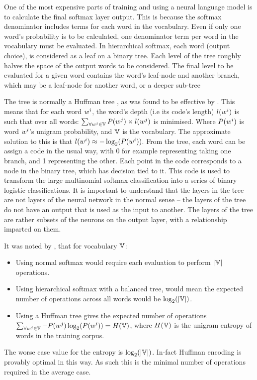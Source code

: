 \documentclass[parskip]{komatufte}
\begin{document}
One of the most expensive parts of training and using a neural language model is  to calculate the final softmax layer output.
This is because the softmax denominator includes terms for each word in the vocabulary.
Even if only one word's probability is to be calculated, one denominator term per word in the vocabulary must be evaluated.
In hierarchical softmax, each word (output choice), is considered as a leaf on a binary tree.
Each level of the tree roughly halves the space of the output words to be considered.
The final level to be evaluated for a given word contains the word's leaf-node and another branch, which may be a leaf-node for another word, or a deeper sub-tree

The tree is normally a Huffman tree , as was found to be effective by \textcite{mikolov2013efficient}.
This means that for each word $\n w_i$, the word's depth (i.e its code's length) $l(\n w_i)$ is such that over all words:
 $\sum_{\forall \n w_j \in \set{V}} P(\n w_j)\times l(\n w_j)$ is minimised.
Where $P(\n w_i)$ is word $\n w_i$'s unigram probability, and $\mathbb{V}$ is the vocabulary.
The approximate solution to this is that $l(\n w_i) \approx -\log_2(P(\n w_i))$.
From the tree, each word can be assign a code in the usual way, with 0 for example representing taking one branch, and 1 representing the other.
Each point in the code corresponds to a node in the binary tree, which has decision tied to it.
This code is used to transform the large  multinomial softmax classification into a series of binary logistic classifications.
It is important to understand that the layers in the tree are not layers of the neural network in the normal sense -- the layers of the tree do not have an output that is used as the input to another.
The layers of the tree are rather subsets of the neurons on the output layer, with a relationship imparted on them.

It was noted by \textcite{mikolov2013efficient}, that for vocabulary $\mathbb{V}$:
\begin{itemize}
	\item Using normal softmax would require each evaluation to perform $|\mathbb{V}|$ operations.
	\item Using hierarchical softmax with a balanced tree, would mean the expected number of operations across all words would be $\log_2(|\mathbb{V}|)$.
	\item Using a Huffman tree gives the expected number of operations $\sum_{\forall \n w_j \in \set{V}} -P(\n w_j)\log_2(P(\n w_i)) = H(\set{V})$, where $H(\mathbb{V})$ is the unigram entropy of words in the training corpus.
\end{itemize}
The worse case value for the entropy is $\log_2(|\mathbb{V}|)$.
In-fact Huffman encoding is provably optimal in this way.
As such this is the minimal number of operations required in the average case.
\end{document}
